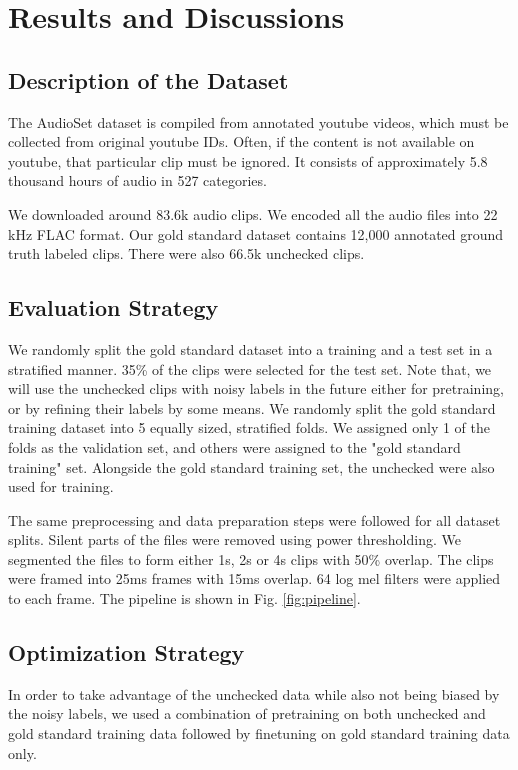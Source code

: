 \documentclass{article}
\begin{document}
\section{Results and Discussions}
\subsection{Description of the Dataset}
The AudioSet dataset \cite{gemmeke2017audio} is compiled from annotated youtube videos, which must be collected from original youtube IDs. Often, if the content is not available on youtube, that particular clip must be ignored. It consists of approximately 5.8 thousand hours of audio in 527 categories.

We downloaded around 83.6k audio clips. We encoded all the audio files into 22 kHz FLAC format. Our gold standard dataset contains 12,000 annotated ground truth labeled clips. There were also 66.5k unchecked clips.

\subsection{Evaluation Strategy}
We randomly split the gold standard dataset into a training and a test set in a stratified manner. 35\% of the clips were selected for the test set. Note that, we will use the unchecked clips with noisy labels in the future either for pretraining, or by refining their labels by some means. We randomly split the gold standard training dataset into 5 equally sized, stratified folds. We assigned only 1 of the folds as the validation set, and others were assigned to the "gold standard training" set. Alongside the gold standard training set, the unchecked were also used for training.

The same preprocessing and data preparation steps were followed for all dataset splits. Silent parts of the files were removed using power thresholding. We segmented the files to form either 1s, 2s or 4s clips with 50\% overlap. The clips were framed into 25ms frames with 15ms overlap. 64 log mel filters were applied to each frame. The pipeline is shown in Fig. \ref{fig:pipeline}.

\subsection{Optimization Strategy}
In order to take advantage of the unchecked data while also not being biased by the noisy labels, we used a combination of pretraining on both unchecked and gold standard training data followed by finetuning on gold standard training data only.
\end{document}

